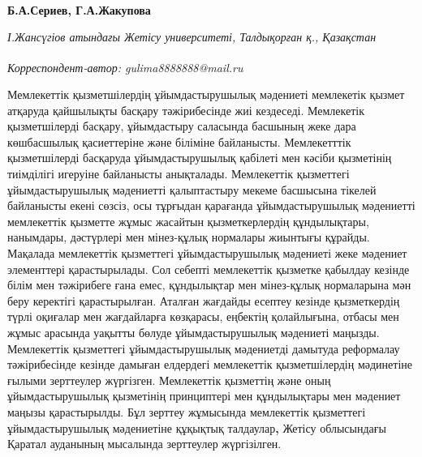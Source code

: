 
\begin{articleheader}

{\bfseries
Б.А.Сериев\authorid,
Г.А.Жакупова\textsuperscript{\envelope } \authorid}
\end{articleheader}

\begin{affiliation}
\emph{І.Жансүгіов атындағы Жетісу университеті, Талдықорған қ., Қазақстан}

\raggedright \textsuperscript{\envelope }{\em Корреспондент-автор: gulima8888888@mail.ru}
\end{affiliation}

Мемлекеттік қызметшілердің ұйымдастырушылық мәдениеті мемлекетік қызмет
атқаруда қайшылықты басқару тәжірибесінде жиі кездеседі. Мемлекетік
қызметшілерді басқару, ұйымдастыру саласында басшының жеке дара
көшбасшылық қасиеттеріне және біліміне байланысты. Мемлекетттік
қызметшілерді басқаруда ұйымдастырушылық қабілеті мен кәсіби қызметінің
тиімділігі игеруіне байланысты анықталады. Мемлекеттік қызметтегі
ұйымдастырушылық мәдениетті қалыптастыру мекеме басшысына тікелей
байланысты екені сөзсіз, осы тұрғыдан қарағанда ұйымдастырушылық
мәдениетті мемлекеттік қызметте жұмыс жасайтын қызметкерлердің
құндылықтары, нанымдары, дәстүрлері мен мінез-құлық нормалары жиынтығы
құрайды. Мақалада мемлекеттік қызметтегі ұйымдастырушылық мәдениеті жеке
мәдениет элементтері қарастырылады. Сол себепті мемлекеттік қызметке
қабылдау кезінде білім мен тәжірибеге ғана емес, құндылықтар мен
мінез-құлық нормаларына мән беру керектігі қарастырылған. Аталған
жағдайды есептеу кезінде қызметкердің түрлі оқиғалар мен жағдайларға
көзқарасы, еңбектің қолайлығына, отбасы мен жұмыс арасында уақытты
бөлуде ұйымдастырушылық мәдениеті маңызды. Мемлекеттік қызметтегі
ұйымдастырушылық мәдениетді дамытуда реформалау тәжірибесінде кезінде
дамыған елдердегі мемлекеттік қызметшілердің мәдинетіне ғылыми
зерттеулер жүргізген. Мемлекеттік қызметтің және оның ұйымдастырушылық
қызметінің принциптері мен құндылықтары мен мәдениет маңызы
қарастырылды. Бұл зерттеу жұмысында мемлекеттік қызметтегі
ұйымдастырушылық мәдениетіне құқықтық талдаулар{\bfseries ,} Жетісу
облысындағы Қаратал ауданының мысалында зерттеулер жүргізілген.

